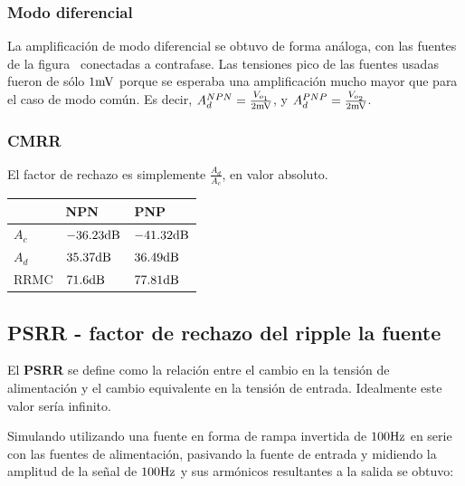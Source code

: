 \subsubsection{Modo diferencial}

La amplificación de modo diferencial se obtuvo de forma análoga, con las fuentes de la figura~ conectadas a contrafase. Las tensiones pico de las fuentes usadas fueron de sólo $1 \si[per-mode=symbol]{\milli\volt}$ porque se esperaba una amplificación mucho mayor que para el caso de modo común. Es decir, $A_{d}^{NPN}=\frac{V_{o_{1}}}{2 \si[per-mode=symbol]{\milli\volt}}$, y $A_{d}^{PNP}=\frac{V_{o_{2}}}{2 \si[per-mode=symbol]{\milli\volt}}$.

\subsubsection{CMRR} 

El factor de rechazo es simplemente $\frac{A_{d}}{A_{c}}$, en valor absoluto.


\begin{table}[H]
\centering
\begin{tabular}{l|ll}
 & NPN & PNP \\ \hline
$A_{c}$ & $-36.23 \si[per-mode=symbol]{\decibel}$ & $-41.32 \si[per-mode=symbol]{\decibel}$  \\
$A_{d}$ & $35.37 \si[per-mode=symbol]{\decibel}$ & $36.49 \si[per-mode=symbol]{\decibel}$  \\
RRMC & $71.6 \si[per-mode=symbol]{\decibel}$ & $77.81 \si[per-mode=symbol]{\decibel}$  
\end{tabular}
\end{table}

\clearpage

\subsection{\textbf{PSRR} - factor de rechazo del ripple la fuente}

El \textbf{PSRR} se define como la relación entre el cambio en la tensión de alimentación y el cambio equivalente en la tensión de entrada. Idealmente este valor sería infinito.

Simulando utilizando una fuente en forma de rampa invertida de $100 \si[per-mode=symbol]{\hertz}$ en serie con las fuentes de alimentación, pasivando la fuente de entrada y midiendo la amplitud de la señal de $100 \si[per-mode=symbol]{\hertz}$ y sus armónicos resultantes a la salida se obtuvo:

